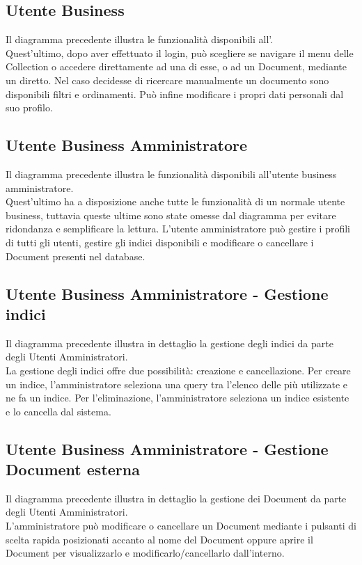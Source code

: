 
\subsection{Utente Business}
Il diagramma precedente illustra le funzionalità disponibili all'.\\
Quest'ultimo, dopo aver effettuato il login, può scegliere se navigare il menu delle Collection o accedere direttamente ad una di esse, o ad un Document, mediante un  diretto.
Nel caso decidesse di ricercare manualmente un documento sono disponibili filtri e ordinamenti.
Può infine modificare i propri dati personali dal suo profilo.

\subsection{Utente Business Amministratore}
Il diagramma precedente illustra le funzionalità disponibili all'utente business amministratore.\\
Quest'ultimo ha a disposizione anche tutte le funzionalità di un normale utente business, tuttavia queste ultime sono state omesse dal diagramma per evitare ridondanza e semplificare la lettura.
L'utente amministratore può gestire i profili di tutti gli utenti, gestire gli indici disponibili e modificare o cancellare i Document presenti nel database.

\subsection{Utente Business Amministratore - Gestione indici}
Il diagramma precedente illustra in dettaglio la gestione degli indici da parte degli Utenti Amministratori.\\
La gestione degli indici offre due possibilità: creazione e cancellazione.
Per creare un indice, l'amministratore seleziona una query tra l'elenco delle più utilizzate e ne fa un indice.
Per l'eliminazione, l'amministratore seleziona un indice esistente e lo cancella dal sistema.

\subsection{Utente Business Amministratore - Gestione Document esterna}
Il diagramma precedente illustra in dettaglio la gestione dei Document da parte degli Utenti Amministratori.\\
L'amministratore può modificare o cancellare un Document mediante i pulsanti di scelta rapida posizionati accanto al nome del Document oppure aprire il Document per visualizzarlo e modificarlo/cancellarlo dall'interno.


